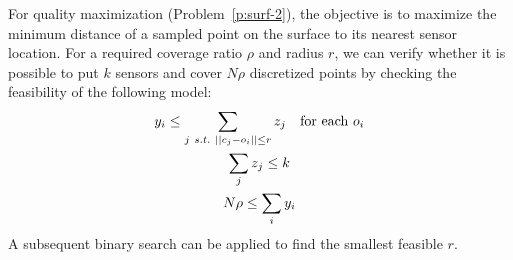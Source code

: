 For quality maximization (Problem~\ref{p:surf-2}), the objective is to maximize 
the minimum distance of a sampled point on the surface to its nearest sensor 
location. 
For a required coverage ratio $\rho$ and radius $r$, we can verify whether it is possible to put $k$ sensors and cover $N\rho$ discretized points by checking the 
feasibility of the following model:
\begin{gather}
    y_i \leq \sum_{j\ s.t.\ ||c_j - o_i|| \leq r}  z_j \text{\quad for each } o_i\\
    \sum_j z_j \leq k\\
    N \rho \leq \sum_i y_i 
\end{gather}
A subsequent binary search can be applied to find the smallest feasible $r$. 

